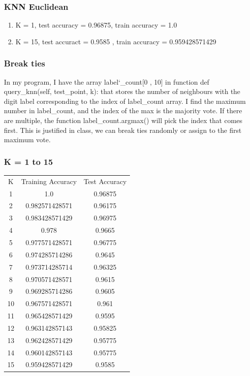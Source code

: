 \documentclass[letterpaper, 12]{article}
\begin{document}
\subsubsection{KNN Euclidean}

\begin{enumerate}[label=(\alph*)]
\item K = 1, test accuracy = 0.96875, train accuracy = 1.0
\item K = 15, test accuract = 0.9585 , train accuracy  = 0.959428571429 
\end{enumerate}

\subsubsection{Break ties}
In my program, I have the array label\char`_count[0 , 10] in function def query\_knn(self, test\_point, k): that stores the number of neighbours with the digit label corresponding to the index of label\_count array. I find the maximum number in label\_count, and the index of the max is the majority vote. If there are multiple, the function label\_count.argmax() will pick the index that comes first. This is justified in class, we can break ties randomly or assign to the first maximum vote.

\subsubsection{K = 1 to 15}

\begin{center}
\begin{tabular}{ |c|c|c| } 
 \hline
 K & Training Accuracy & Test Accuracy  \\
 1  &  1.0  &  0.96875 \\
2  &  0.982571428571  &  0.96175 \\
3  &  0.983428571429  &  0.96975  \\
4  &  0.978  &  0.9665 \\
5  &  0.977571428571  &  0.96775 \\
6  &  0.974285714286  &  0.9645  \\
7  &  0.973714285714  &  0.96325 \\
8  &  0.970571428571  &  0.9615  \\
9  &  0.969285714286  &  0.9605  \\
10  &  0.967571428571  &  0.961 \\
11  &  0.965428571429  &  0.9595 \\
12  &  0.963142857143  &  0.95825 \\
13  &  0.962428571429  &  0.95775 \\
14  &  0.960142857143  &  0.95775 \\
15  &  0.959428571429  &  0.9585  \\
 \hline
\end{tabular}
\end{center}
\end{document}
